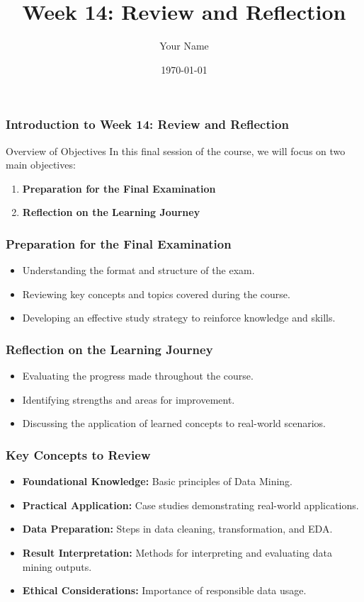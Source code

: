 \documentclass{beamer}
\title{Week 14: Review and Reflection}
\author{Your Name}
\institute{Your Institution}
\date{\today}
\begin{document}
\frame{\titlepage}

\begin{frame}[fragile]
    \frametitle{Introduction to Week 14: Review and Reflection}
    \begin{block}{Overview of Objectives}
        In this final session of the course, we will focus on two main objectives:
    \end{block}
    \begin{enumerate}
        \item \textbf{Preparation for the Final Examination}
        \item \textbf{Reflection on the Learning Journey}
    \end{enumerate}
\end{frame}

\begin{frame}[fragile]
    \frametitle{Preparation for the Final Examination}
    \begin{itemize}
        \item Understanding the format and structure of the exam.
        \item Reviewing key concepts and topics covered during the course.
        \item Developing an effective study strategy to reinforce knowledge and skills.
    \end{itemize}
\end{frame}

\begin{frame}[fragile]
    \frametitle{Reflection on the Learning Journey}
    \begin{itemize}
        \item Evaluating the progress made throughout the course.
        \item Identifying strengths and areas for improvement.
        \item Discussing the application of learned concepts to real-world scenarios.
    \end{itemize}
\end{frame}

\begin{frame}[fragile]
    \frametitle{Key Concepts to Review}
    \begin{itemize}
        \item \textbf{Foundational Knowledge:} Basic principles of Data Mining.
        \item \textbf{Practical Application:} Case studies demonstrating real-world applications.
        \item \textbf{Data Preparation:} Steps in data cleaning, transformation, and EDA.
        \item \textbf{Result Interpretation:} Methods for interpreting and evaluating data mining outputs.
        \item \textbf{Ethical Considerations:} Importance of responsible data usage.
    \end{itemize}
\end{frame}
\end{document}
